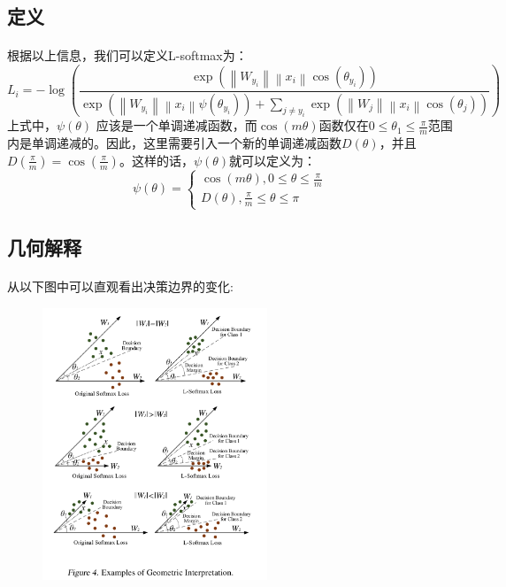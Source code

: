 \documentclass[10pt,letterpaper]{article}
\begin{document}
\subsection{定义}
\paragraph{} 根据以上信息，我们可以定义L-softmax为：
\begin{equation}
	L_i = -\log(\frac{\exp(\left \| W_{y_i} \right \|\left \| x_i \right \|\cos(\theta_{y_i}))}{\exp(\left \| W_{y_i} \right \|\left \| x_i \right \|\psi(\theta_{y_i})) + \sum_{j\neq y_i }\exp(\left \| W_j \right \|\left \| x_i \right \|\cos(\theta_j))} )	
\end{equation}
上式中，$\psi(\theta)$ 应该是一个单调递减函数，而$\cos(m\theta)$函数仅在$0 \leq \theta_1 \leq \frac{\pi}{m} $范围内是单调递减的。因此，这里需要引入一个新的单调递减函数$D(\theta)$，并且$D(\frac{\pi}{m})=\cos(\frac{\pi}{m})$。这样的话，$\psi(\theta)$就可以定义为：
\begin{equation}
	\psi(\theta) = \left \{ \begin{matrix}
		\cos(m\theta), 0 \leq \theta \leq \frac{\pi}{m}
		\\ 
		D(\theta), \frac{\pi}{m} \leq \theta \leq \pi
	\end{matrix}\right.
\end{equation}
\subsection{几何解释}
\paragraph{}从以下图中可以直观看出决策边界的变化:
\begin{figure}[H]
	\centering
	\includegraphics[width=0.6\textwidth]{../images/l-loss-geo.png}
	\caption{}
	\label{l-softmax 集合解释}
\end{figure}
\end{document}
